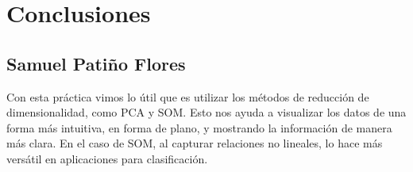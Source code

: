 \section[Conclusiones]{Conclusiones}

\subsection[SPF]{Samuel Patiño Flores}
Con esta práctica vimos lo útil que es utilizar los métodos de reducción de dimensionalidad, como PCA y SOM. Esto nos ayuda a visualizar los datos de una forma más intuitiva, en forma de plano, y mostrando la información de manera más clara. En el caso de SOM, al capturar relaciones no lineales, lo hace más versátil en aplicaciones para clasificación.
